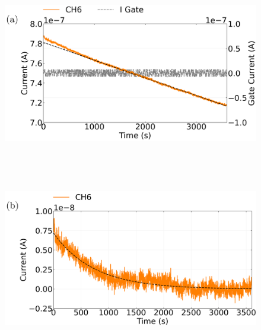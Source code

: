 \documentclass[
  a4paper,
]{scrbook}
\begin{document}
\begin{figure}

\begin{minipage}[t]{0.15\linewidth}

{\centering 

~

}

\end{minipage}%
%
\begin{minipage}[t]{0.70\linewidth}

{\centering 

\includegraphics{figures/ch6/Q2C6_fitted_curves_edited.png} {}

}

\end{minipage}%
%
\begin{minipage}[t]{0.15\linewidth}

{\centering 

~

}

\end{minipage}%
\newline
\begin{minipage}[t]{0.15\linewidth}

{\centering 

~

}

\end{minipage}%
%
\begin{minipage}[t]{0.70\linewidth}

{\centering 

\includegraphics{figures/ch6/Q2C6_fitted_curves_exp_edited.png} {}

}
\end{minipage}
\end{figure}
\end{document}
